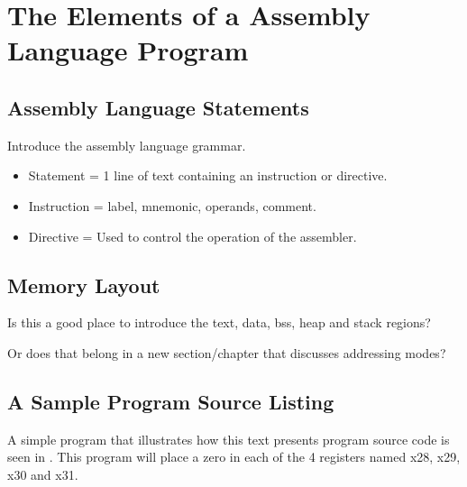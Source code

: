 \chapter{The Elements of a Assembly Language Program}
\label{chapter:elements}

\section{Assembly Language Statements}

Introduce the assembly language grammar. 
\begin{itemize}
\item Statement = 1 line of text containing an instruction or directive.
\item Instruction = label, mnemonic, operands, comment.
\item Directive = Used to control the operation of the assembler.
\end{itemize}

\section{Memory Layout}

Is this a good place to introduce the text, data, bss, heap and stack regions?

Or does that belong in a new section/chapter that discusses addressing modes?


\section{A Sample Program Source Listing}

A simple program that illustrates how this text presents 
program source code is seen in .
This program will place a zero in each of the 4 registers 
named x28, x29, x30 and x31.


